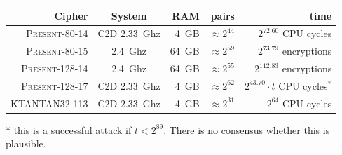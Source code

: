 \documentclass[9pt]{beamer}
\newcommand{\PRESENT}{\textsc{Present}\xspace}
\begin{document}
\begin{frame}[allowframebreaks]
\begin{table}[htbp]
\begin{center}
\begin{tabular}{|r|c|r|r|r|}
\hline
Cipher & System & RAM & pairs & time\\
\hline
 \PRESENT-80-14 & C2D 2.33~Ghz & 4~GB & $\approx 2^{44}$ & $2^{72.60}$ CPU cycles \\
 \PRESENT-80-15 & 2.4~Ghz & 64~GB & $\approx 2^{59}$ & $2^{73.79}$ encryptions \\
\PRESENT-128-14 & 2.4~Ghz & 64~GB & $\approx 2^{55}$ & $2^{112.83}$ encryptions\\ 
\PRESENT-128-17 & C2D 2.33~Ghz & 4~GB & $\approx 2^{62}$ & $2^{43.70} \cdot t$ CPU cycles$^*$\\ 
  KTANTAN32-113 & C2D 2.33~Ghz & 4~GB & $\approx 2^{31}$ & $2^{64}$ CPU cycles\\
\hline
\end{tabular}
\end{center}
\end{table}

\vspace{4em}

\begin{small}
* this is a successful attack if $t < 2^{89}$. There is no consensus whether this is plausible.
\end{small}

% 
% 
% 

\end{frame}
\end{document}
